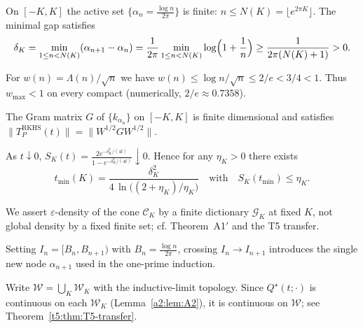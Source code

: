 \begin{remark}
On $[-K,K]$ the active set $\{\alpha_n=\tfrac{\log n}{2\pi}\}$ is finite: $n\le N(K)=\lfloor e^{2\pi K}\rfloor$. The minimal gap satisfies
\[
  \delta_K = \min_{1\le n<N(K)} (\alpha_{n+1}-\alpha_n) = \frac{1}{2\pi}\min_{1\le n<N(K)}\log\Bigl(1+\frac1n\Bigr)
  \ge \frac{1}{2\pi (N(K)+1)} > 0.
\]
\end{remark}

\begin{remark}
For $w(n)=\Lambda(n)/\sqrt n$ we have $w(n)\le \log n/\sqrt n \le 2/e<3/4<1$. Thus $w_{\max}<1$ on every compact (numerically, $2/e\approx0.7358$).
\end{remark}

\begin{remark}
The Gram matrix $G$ of $\{k_{\alpha_n}\}$ on $[-K,K]$ is finite dimensional and satisfies $\|T_P^{\mathrm{RKHS}}(t)\|=\|W^{1/2}GW^{1/2}\|$.
\end{remark}

\begin{remark}
As $t\downarrow0$, $S_K(t)=\tfrac{2e^{-\delta_K^2/(4t)}}{1-e^{-\delta_K^2/(4t)}}\downarrow0$. Hence for any $\eta_K>0$ there exists
\[
  t_{\min}(K)=\frac{\delta_K^2}{4\,\ln\!\bigl((2+\eta_K)/\eta_K\bigr)} \quad\text{with}\quad S_K(t_{\min})\le \eta_K.
\]
\end{remark}

\begin{remark}
We assert $\varepsilon$-density of the cone $\mathcal C_K$ by a finite dictionary $\mathcal G_K$ at fixed $K$, not global density by a fixed finite set; cf. Theorem~A1$'$ and the T5 transfer.
\end{remark}

\begin{remark}
Setting $I_n=[B_n,B_{n+1})$ with $B_n=\tfrac{\log n}{2\pi}$, crossing $I_n\to I_{n+1}$ introduces the single new node $\alpha_{n+1}$ used in the one-prime induction.
\end{remark}

\begin{remark}
Write $\mathcal W=\bigcup_K \mathcal W_K$ with the inductive-limit topology. Since $Q^\star(t;\cdot)$ is continuous on each $\mathcal W_K$ (Lemma~\ref{a2:lem:A2}), it is continuous on $\mathcal W$; see Theorem~\ref{t5:thm:T5-transfer}.
\end{remark}

